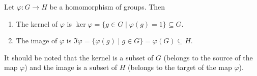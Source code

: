 \begin{definition}
Let $\varphi\colon G\to H$ be a homomorphism of groups.
Then
\begin{enumerate}
\item The kernel of $\varphi$ is $\ker \varphi = \{g\in G \mid \varphi(g) = 1\} \subseteq G$.

\item The image of $\varphi$ is $\Im \varphi = \{\varphi(g)\mid g\in G\} = \varphi(G) \subseteq H$.
\end{enumerate}
\end{definition}

It should be noted that the kernel is a subset of $G$ (belongs to the source of the map $\varphi$) and the image is a subset of $H$ (belongs to the target of the map $\varphi$).

